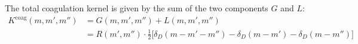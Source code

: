 
    The total coagulation kernel is given by the sum of the two components $G$ and $L$:
    \begin{align}
        K^\text{coag}(m,m',m'') 
        &= G(m,m',m'') + L(m,m',m'')
        \\
        &= R(m',m'') \cdot \frac{1}{2}
        \bigg[
            \delta_D(m-m'-m'') - \delta_D(m-m') - \delta_D(m-m'')
        \bigg]
    \end{align}

